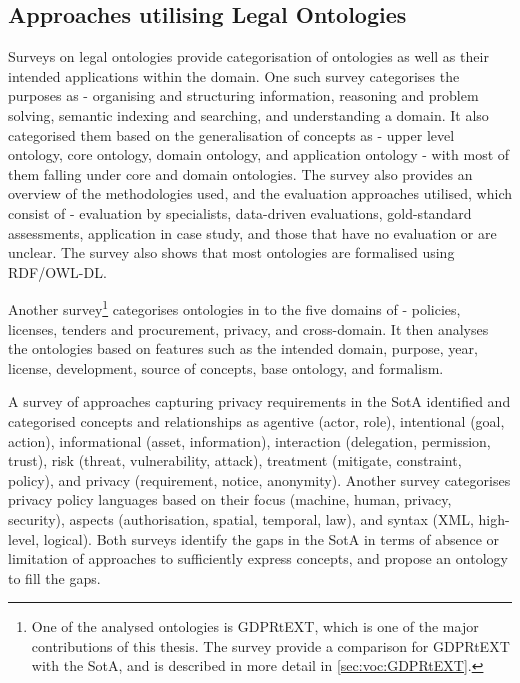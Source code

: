 \subsection{Approaches utilising Legal Ontologies}
Surveys on legal ontologies provide categorisation of ontologies as well as their intended applications within the domain. One such survey \cite{rodrigues_legal_2019} categorises the purposes as - organising and structuring information, reasoning and problem solving, semantic indexing and searching, and understanding a domain. It also categorised them based on the generalisation of concepts as - upper level ontology, core ontology, domain ontology, and application ontology - with most of them falling under core and domain ontologies. The survey also provides an overview of the methodologies used, and the evaluation approaches utilised, which consist of - evaluation by specialists, data-driven evaluations, gold-standard assessments, application in case study, and those that have no evaluation or are unclear. The survey also shows that most ontologies are formalised using RDF/OWL-DL.

Another survey\footnote{One of the analysed ontologies is GDPRtEXT, which is one of the major contributions of this thesis. The survey provide a comparison for GDPRtEXT with the SotA, and is described in more detail in \autoref{sec:voc:GDPRtEXT}.} \cite{leone_taking_2019} categorises ontologies in to the five domains of - policies, licenses, tenders and procurement, privacy, and cross-domain. It then analyses the ontologies based on features such as the intended domain, purpose, year, license, development, source of concepts, base ontology, and formalism.

A survey of approaches capturing privacy requirements in the SotA \cite{gharib_towards_2017} identified and categorised concepts and relationships as agentive (actor, role), intentional (goal, action), informational (asset, information), interaction (delegation, permission, trust), risk (threat, vulnerability, attack), treatment (mitigate, constraint, policy), and privacy (requirement, notice, anonymity).
Another survey \cite{van_de_ven_qualitative_2016} categorises privacy policy languages based on their focus (machine, human, privacy, security), aspects (authorisation, spatial, temporal, law), and syntax (XML, high-level, logical).
Both surveys identify the gaps in the SotA in terms of absence or limitation of approaches to sufficiently express concepts, and propose an ontology to fill the gaps.

